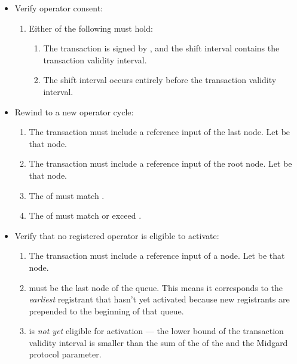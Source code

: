 \documentclass[../midgard.tex]{subfiles}
\begin{document}
\begin{description}
\begin{itemize}
            \item Verify operator consent:
            \begin{enumerate}[resume]
                \item Either of the following must hold:
                \begin{enumerate}
                    \item The transaction is signed by , and the  shift interval contains the transaction validity interval.
                    \item The  shift interval occurs entirely before the transaction validity interval.
                \end{enumerate}
            \end{enumerate}
            
            \item Rewind to a new operator cycle:
            \begin{enumerate}[resume]
                \item The transaction must include a reference input of the last  node. Let  be that node.
                \item The transaction must include a reference input of the root  node. Let  be that node.
                \item The  of  must match .
                \item The  of  must match or exceed .
            \end{enumerate}
            
            \item Verify that no registered operator is eligible to activate:
            \begin{enumerate}[resume]
                \item The transaction must include a reference input of a  node. Let  be that node.
                \item {} must be the last node of the  queue. This means it corresponds to the \emph{earliest} registrant that hasn't yet activated because new registrants are prepended to the beginning of that queue.
                \item {} is \emph{not yet} eligible for activation --- the lower bound of the transaction validity interval is smaller than the sum of the  of the  and the Midgard  protocol parameter.
            \end{enumerate}
        \end{itemize}
\end{description}
\end{document}

